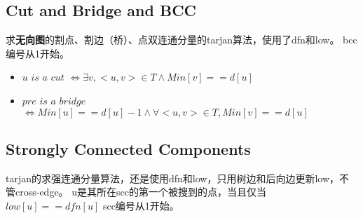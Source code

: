	\newpage
	\subsection{Cut and Bridge and BCC}
		\begin{flushleft}
			求\textbf{无向图}的割点、割边（桥）、点双连通分量的tarjan算法，使用了dfn和low。
			\linebreak bcc编号从1开始。
		\end{flushleft}
		
		\begin{itemize}
			\item $u$ $is$ $a$ $cut$ $\Leftrightarrow \exists v, <u, v> \in T \wedge Min[v] == d[u]$
			\item $pre$ $is$ $a$ $bridge$ $\Leftrightarrow Min[u] == d[u] - 1 \wedge \forall <u, v> \in T, Min[v] == d[u]$
		\end{itemize}

	\newpage
	\subsection{Strongly Connected Components}
		\begin{flushleft}
			tarjan的求强连通分量算法，还是使用dfn和low，只用树边和后向边更新low，不管cross-edge。
			\linebreak u是其所在scc的第一个被搜到的点，当且仅当$low[u] == dfn[u]$
			\linebreak scc编号从1开始。
		\end{flushleft}
		